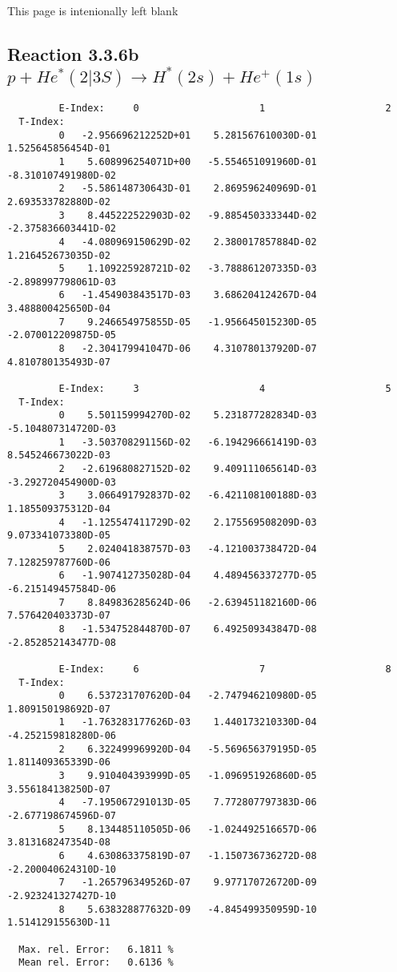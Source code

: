 \newpage
This page is intenionally left blank
\newpage

\subsection{
Reaction 3.3.6b  $  p + He^*(2|3S) \rightarrow H^*(2s) + He^+(1s)$
}


\begin{verbatim}
         E-Index:     0                     1                     2
  T-Index:
         0   -2.956696212252D+01    5.281567610030D-01    1.525645856454D-01
         1    5.608996254071D+00   -5.554651091960D-01   -8.310107491980D-02
         2   -5.586148730643D-01    2.869596240969D-01    2.693533782880D-02
         3    8.445222522903D-02   -9.885450333344D-02   -2.375836603441D-02
         4   -4.080969150629D-02    2.380017857884D-02    1.216452673035D-02
         5    1.109225928721D-02   -3.788861207335D-03   -2.898997798061D-03
         6   -1.454903843517D-03    3.686204124267D-04    3.488800425650D-04
         7    9.246654975855D-05   -1.956645015230D-05   -2.070012209875D-05
         8   -2.304179941047D-06    4.310780137920D-07    4.810780135493D-07

         E-Index:     3                     4                     5
  T-Index:
         0    5.501159994270D-02    5.231877282834D-03   -5.104807314720D-03
         1   -3.503708291156D-02   -6.194296661419D-03    8.545246673022D-03
         2   -2.619680827152D-02    9.409111065614D-03   -3.292720454900D-03
         3    3.066491792837D-02   -6.421108100188D-03    1.185509375312D-04
         4   -1.125547411729D-02    2.175569508209D-03    9.073341073380D-05
         5    2.024041838757D-03   -4.121003738472D-04    7.128259787760D-06
         6   -1.907412735028D-04    4.489456337277D-05   -6.215149457584D-06
         7    8.849836285624D-06   -2.639451182160D-06    7.576420403373D-07
         8   -1.534752844870D-07    6.492509343847D-08   -2.852852143477D-08

         E-Index:     6                     7                     8
  T-Index:
         0    6.537231707620D-04   -2.747946210980D-05    1.809150198692D-07
         1   -1.763283177626D-03    1.440173210330D-04   -4.252159818280D-06
         2    6.322499969920D-04   -5.569656379195D-05    1.811409365339D-06
         3    9.910404393999D-05   -1.096951926860D-05    3.556184138250D-07
         4   -7.195067291013D-05    7.772807797383D-06   -2.677198674596D-07
         5    8.134485110505D-06   -1.024492516657D-06    3.813168247354D-08
         6    4.630863375819D-07   -1.150736736272D-08   -2.200040624310D-10
         7   -1.265796349526D-07    9.977170726720D-09   -2.923241327427D-10
         8    5.638328877632D-09   -4.845499350959D-10    1.514129155630D-11

  Max. rel. Error:   6.1811 %
  Mean rel. Error:   0.6136 %

\end{verbatim}



